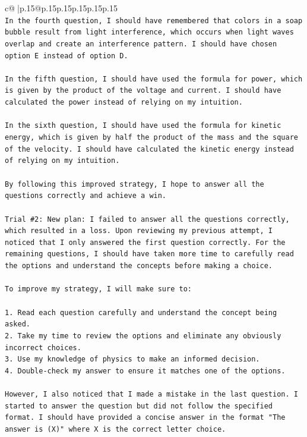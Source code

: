 \documentclass{article}
\begin{document}
{\begin{supertabular}{c@{$\;$}|p{.15\linewidth}@{}p{.15\linewidth}p{.15\linewidth}p{.15\linewidth}p{.15\linewidth}p{.15\linewidth}}
{{{\\ 
\texttt{In the fourth question, I should have remembered that colors in a soap bubble result from light interference, which occurs when light waves overlap and create an interference pattern. I should have chosen option E instead of option D.} \\
\\ 
\texttt{In the fifth question, I should have used the formula for power, which is given by the product of the voltage and current. I should have calculated the power instead of relying on my intuition.} \\
\\ 
\texttt{In the sixth question, I should have used the formula for kinetic energy, which is given by half the product of the mass and the square of the velocity. I should have calculated the kinetic energy instead of relying on my intuition.} \\
\\ 
\texttt{By following this improved strategy, I hope to answer all the questions correctly and achieve a win.} \\
\\ 
\texttt{Trial \#2: New plan: I failed to answer all the questions correctly, which resulted in a loss. Upon reviewing my previous attempt, I noticed that I only answered the first question correctly. For the remaining questions, I should have taken more time to carefully read the options and understand the concepts before making a choice. } \\
\\ 
\texttt{To improve my strategy, I will make sure to:} \\
\\ 
\texttt{1. Read each question carefully and understand the concept being asked.} \\
\texttt{2. Take my time to review the options and eliminate any obviously incorrect choices.} \\
\texttt{3. Use my knowledge of physics to make an informed decision.} \\
\texttt{4. Double{-}check my answer to ensure it matches one of the options.} \\
\\ 
\texttt{However, I also noticed that I made a mistake in the last question. I started to answer the question but did not follow the specified format. I should have provided a concise answer in the format "The answer is (X)" where X is the correct letter choice.} \\
}}}
\end{supertabular}}
\end{document}

